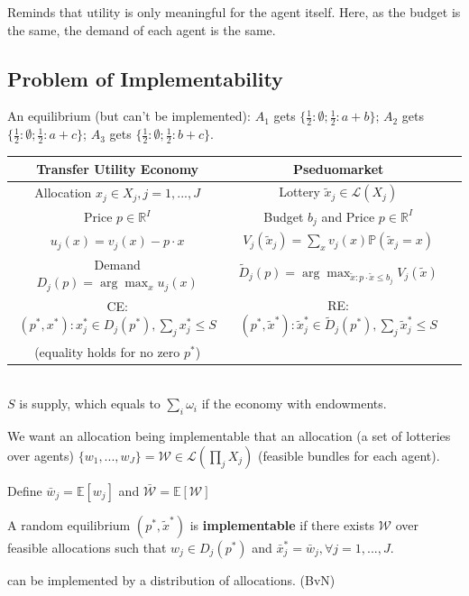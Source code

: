 \documentclass[11pt]{elegantbook}
\begin{document}
Reminds that utility is only meaningful for the agent itself. Here, as the budget is the same, the demand of each agent is the same.

\subsection{Problem of Implementability}
An equilibrium (but can't be implemented): $A_1$ gets $\{\frac{1}{2}:\emptyset; \frac{1}{2}:a+b\}$; $A_2$ gets $\{\frac{1}{2}:\emptyset; \frac{1}{2}:a+c\}$; $A_3$ gets $\{\frac{1}{2}:\emptyset; \frac{1}{2}:b+c\}$.


\begin{center}
    \begin{tabular}{ccc}
        \hline
            Transfer Utility Economy& Pseduomarket\\
        \hline
            Allocation $x_j\in X_j,j=1,...,J$& Lottery $\tilde{x}_j\in \mathcal{L}(X_j)$\\
            Price $p\in \mathbb{R}^I$& Budget $b_j$ and Price $p\in \mathbb{R}^I$\\
            $u_j(x)=v_j(x)-p\cdot x$& $V_j(\tilde{x}_j)=\sum_x v_j(x) \mathbb{P}(\tilde{x}_j=x)$\\
            Demand $D_j(p)=\arg\max_x u_j(x)$& $\tilde{D}_j(p)=\arg\max_{\tilde{x}:p\cdot\tilde{x}\leq b_j} V_j(\tilde{x})$\\
            CE: $(p^*,x^*): x_j^*\in D_j(p^*), \sum_{j}x_j^*\leq S$& RE: $(p^*,\tilde{x}^*): \tilde{x}_j^*\in \tilde{D}_j(p^*), \sum_{j}\tilde{x}_j^*\leq S$\\
            (equality holds for no zero $p^*$)\\
        \hline
    \end{tabular}\\
    $S$ is supply, which equals to $\sum_i \omega_i$ if the economy with endowments.
\end{center}

We want an allocation being implementable that an allocation (a set of lotteries over agents) $\{w_1,...,w_J\}=\mathcal{W}\in \mathcal{L}(\prod_{j}X_j)$ (feasible bundles for each agent).

Define $\bar{w}_j=\mathbb{E}[w_j]$ and $\bar{\mathcal{W}}=\mathbb{E}[\mathcal{W}]$

\begin{definition}[Implementable]
    \normalfont
    A random equilibrium $(p^*,\tilde{x}^*)$ is \textbf{implementable} if there exists $\mathcal{W}$ over feasible allocations such that $w_j\in D_j(p^*)$ and $\bar{x}^*_j=\bar{w}_j, \forall j=1,...,J$.
\end{definition}
can be implemented by a distribution of allocations. (BvN)
\end{document}

